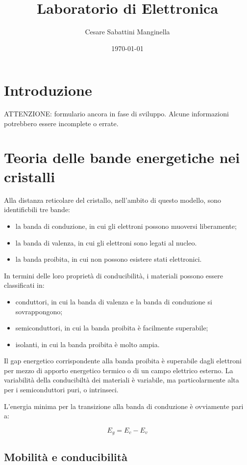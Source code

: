 \documentclass{article}
\title{Laboratorio di Elettronica}
\author{Cesare Sabattini Manginella}
\date{\today}
\begin{document}
\maketitle

\section{Introduzione}
ATTENZIONE: formulario ancora in fase di sviluppo. Alcune informazioni potrebbero essere incomplete o errate.

\section{Teoria delle bande energetiche nei cristalli}
Alla distanza reticolare del cristallo, nell'ambito di questo modello, sono identificbili tre bande:
\begin{itemize}
    \item la banda di conduzione, in cui gli elettroni possono muoversi liberamente;
    \item la banda di valenza, in cui gli elettroni sono legati al nucleo.
    \item la banda proibita, in cui non possono esistere stati elettronici.
\end{itemize}

In termini delle loro proprietà di conducibilità, i materiali possono essere classificati in:
\begin{itemize}
    \item conduttori, in cui la banda di valenza e la banda di conduzione si sovrappongono;
    \item semiconduttori, in cui la banda proibita è facilmente superabile;
    \item isolanti, in cui la banda proibita è molto ampia.
\end{itemize}

Il gap energetico corrispondente alla banda proibita è superabile dagli elettroni per mezzo di apporto energetico termico o di un campo elettrico esterno.
La variabilità della conducibiltà dei materiali è variabile, ma particolarmente alta per i semiconduttori puri, o intrinseci.

L'energia minima per la transizione alla banda di conduzione è ovviamente pari a:

\begin{equation}
    E_g = E_c - E_v
\end{equation}

\subsection*{Mobilità e conducibilità}
\end{document}
